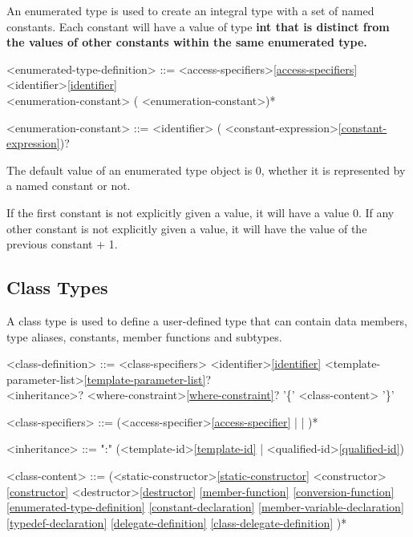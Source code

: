\documentclass[a4paper,oneside,11pt]{article}
\begin{document}
An enumerated type is used to create an integral type with a set of named constants.
Each constant will have a value of type \bf{int} that is distinct
from the values of other constants within the same enumerated type.

\begin{grammar}
\label{enumerated-type-definition}<enumerated-type-definition> ::= <access-specifiers>\ref{access-specifiers}  <identifier>\ref{identifier}\\
                      \lit{(} <enumeration-constant> (\lit*{,} <enumeration-constant>)* \lit{)}

<enumeration-constant> ::= <identifier> (\lit*{=} <constant-expression>\ref{constant-expression})?
\end{grammar}

The default value of an enumerated type object is 0, whether it is represented by a named constant or not.

If the first constant is not explicitly given a value, it will have a value 0.
If any other constant is not explicitly given a value, it will have the value of the previous constant + 1.

\subsection{Class Types}

A class type is used to define a user-defined type that can contain data members, type aliases, constants, member functions and subtypes.

\begin{grammar}
\label{class-definition}<class-definition> ::= <class-specifiers>  <identifier>\ref{identifier} <template-parameter-list>\ref{template-parameter-list}?\\
<inheritance>? <where-constraint>\ref{where-constraint}? '\{' <class-content> '\}'

<class-specifiers> ::= (<access-specifier>\ref{access-specifier} |  | )*

<inheritance> ::= ":" (<template-id>\ref{template-id} | <qualified-id>\ref{qualified-id})

<class-content> ::= (<static-constructor>\ref{static-constructor}
\alt <constructor>\ref{constructor}
\alt <destructor>\ref{destructor}
\ref{member-function}
\ref{conversion-function}
\ref{enumerated-type-definition}
\ref{constant-declaration}
\ref{member-variable-declaration}
\ref{typedef-declaration}
\ref{delegate-definition}
\ref{class-delegate-definition}
)*
\end{grammar}
\end{document}
